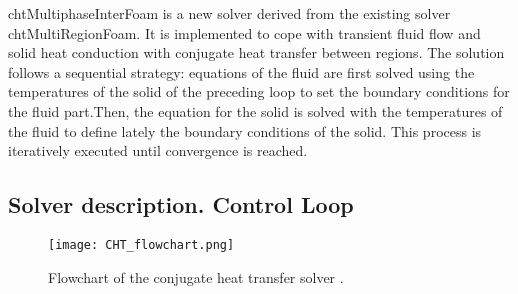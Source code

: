 chtMultiphaseInterFoam is a new solver derived from the existing solver chtMultiRegionFoam. It is implemented to cope with transient fluid flow and solid heat conduction with conjugate heat transfer between regions.
The solution follows a sequential strategy: equations of the fluid are first solved using the temperatures of the solid of the preceding loop to set the boundary conditions for the fluid part.Then, the equation for the solid is solved with the temperatures of the fluid to define lately the boundary conditions of the solid. This process is iteratively executed until convergence is reached.
\subsection{Solver description. Control Loop}
\begin{figure}[h!]
	\centering
	\texttt{[image: CHT\_flowchart.png]}	
	\label{4.2fig}
	\caption{Flowchart of the conjugate heat transfer solver \cite{sugimoto_kuramae_matsumoto_watanabe_2021}.}
\end{figure} 

